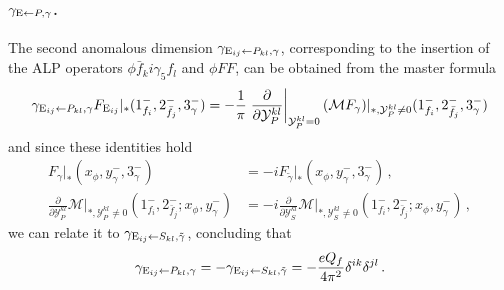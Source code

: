 \paragraph{$\gamma_{\textup{E}\leftarrow P,\gamma}$.}
The second anomalous dimension $\gamma_{\textup{E}_{ij}\leftarrow P_{kl},\gamma}$, corresponding to the insertion of the ALP operators $\phi \bar f_k i\gamma_5 f_l$ and $\phi FF$, can be obtained from the master formula
\begin{equation}
    \gamma_{\textup{E}_{ij}\leftarrow P_{kl},\gamma} F_{\text{E}_{ij}}|_*(1^-_{f_i},2^-_{\bar f_j},3^-_\gamma) = -\frac{1}{\pi}\left.\frac{\partial}{\partial \mathcal Y_P^{kl}}\right|_{\mathcal Y_P^{kl}=0}(\mathcal M F_{\gamma})|_{*,\mathcal Y_P^{kl}\neq 0}(1^-_{f_i},2^-_{\bar f_j},3^-_\gamma)
\end{equation}
and since these identities hold
\begin{align}
    F_{\gamma}|_*(x_\phi,y^-_\gamma,3_\gamma^-) &= -i F_{\tilde\gamma}|_*(x_\phi,y^-_\gamma,3_\gamma^-) \,,
    \label{eq:F_gamma_identity}\\
    \frac{\partial}{\partial \mathcal Y_P^{kl}}\mathcal M|_{*,\mathcal Y_P^{kl}\neq 0}(1^-_{f_i},2^-_{\bar f_j};x_\phi,y^-_\gamma)&=-i \frac{\partial}{\partial \mathcal Y_S^{kl}} \mathcal M|_{*,\mathcal Y_S^{kl}\neq 0}(1^-_{f_i},2^-_{\bar f_j};x_\phi,y^-_\gamma)\,,\label{eq:amplitudeyukawaidentity}
\end{align}
we can relate it to $\gamma_{\textup{E}_{ij}\leftarrow S_{kl},\tilde\gamma}$, concluding that
\begin{equation}
    \gamma_{\textup{E}_{ij}\leftarrow P_{kl},\gamma} = - \gamma_{\textup{E}_{ij}\leftarrow S_{kl},\tilde\gamma}= -\frac{eQ_f }{4\pi^2}\delta^{ik}\delta^{jl}\,.
\end{equation}

